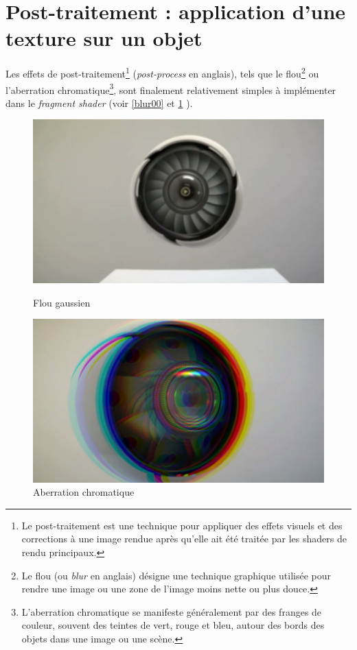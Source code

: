 
\newpage
\section{Post-traitement : application d'une texture sur un objet}

Les effets de post-traitement\footnote{Le post-traitement est une technique pour appliquer des effets visuels et des corrections à une image rendue après qu'elle ait été traitée par les shaders de rendu principaux.} (\textit{post-process} en anglais), tels que le flou\footnote{Le flou (ou \textit{blur} en anglais) désigne une technique graphique utilisée pour rendre une image ou une zone de l'image moins nette ou plus douce.} ou l'aberration chromatique\footnote{L'aberration chromatique se manifeste généralement par des franges de couleur, souvent des teintes de vert, rouge et bleu, autour des bords des objets dans une image ou une scène.}, sont finalement relativement simples à implémenter dans le \textit{fragment shader} (voir \ref{blur00} et \ref{chr_ab00} ).

\begin{figure}[h]
  \begin{minipage}[b]{0.45\linewidth}
    \centering
    \includegraphics[width=\linewidth]{images/post_process/blur00.JPG}
    \caption{Flou gaussien}
    \label{blur00}
  \end{minipage}
  \hspace{0.1\linewidth} %
  \begin{minipage}[b]{0.45\linewidth}
    \centering
    \includegraphics[width=\linewidth]{images/post_process/chr_ab00.JPG}
    \caption{Aberration chromatique}
    \label{chr_ab00}
  \end{minipage}
\end{figure}


